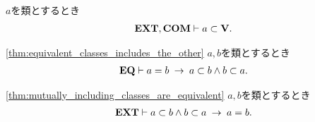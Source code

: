 	\begin{screen}
		\begin{thm}
			$a$を類とするとき
			\begin{align}
				\mbox{{\bf EXT}},\mbox{\bf COM} \vdash a \subset \mathbf{V}.
			\end{align}
		\end{thm}
	\end{screen}
	
	\begin{screen}
		\begin{thm}[等しい類は相手を包含する]
		\ref{thm:equivalent_classes_includes_the_other}
			$a,b$を類とするとき
			\begin{align}
				\mbox{{\bf EQ}} \vdash a = b \hspace{0.25em}\rightarrow\hspace{0.25em} a \subset b \wedge b \subset a.
			\end{align}
		\end{thm}
	\end{screen}
	
	\begin{screen}
		\begin{thm}[互いに相手を包含する類同士は等しい]
		\ref{thm:mutually_including_classes_are_equivalent}
			$a,b$を類とするとき
			\begin{align}
				\mbox{{\bf EXT}} \vdash a \subset b \wedge b \subset a \hspace{0.25em}\rightarrow\hspace{0.25em} a = b.
			\end{align}
		\end{thm}
	\end{screen}